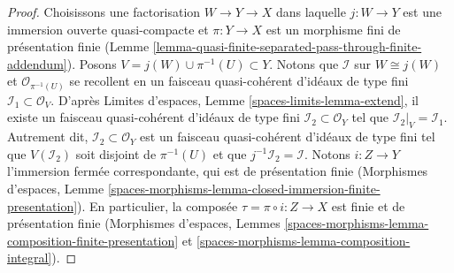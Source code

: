 \begin{proof}
Choisissons une factorisation $W \to Y \to X$ dans laquelle $j : W \to Y$ est une
immersion ouverte quasi-compacte et $\pi : Y \to X$ est un morphisme fini
de présentation finie
(Lemme \ref{lemma-quasi-finite-separated-pass-through-finite-addendum}).
Posons $V = j(W) \cup \pi^{-1}(U) \subset Y$. Notons que
$\mathcal{I}$ sur $W \cong j(W)$ et $\mathcal{O}_{\pi^{-1}(U)}$
se recollent en un faisceau quasi-cohérent d'idéaux de type fini
$\mathcal{I}_1 \subset \mathcal{O}_V$. D'après
Limites d'espaces, Lemme \ref{spaces-limits-lemma-extend},
il existe un faisceau quasi-cohérent d'idéaux de type fini
$\mathcal{I}_2 \subset \mathcal{O}_Y$ tel que
$\mathcal{I}_2|_V = \mathcal{I}_1$. Autrement dit,
$\mathcal{I}_2 \subset \mathcal{O}_Y$
est un faisceau quasi-cohérent d'idéaux de type fini tel que
$V(\mathcal{I}_2)$ soit disjoint de $\pi^{-1}(U)$ et que
$j^{-1}\mathcal{I}_2 = \mathcal{I}$. Notons $i : Z \to Y$
l'immersion fermée correspondante, qui est de présentation finie
(Morphismes d'espaces, Lemme
\ref{spaces-morphisms-lemma-closed-immersion-finite-presentation}).
En particulier, la composée $\tau = \pi \circ i : Z \to X$ est finie
et de présentation finie
(Morphismes d'espaces, Lemmes
\ref{spaces-morphisms-lemma-composition-finite-presentation} et
\ref{spaces-morphisms-lemma-composition-integral}).


\end{proof}
